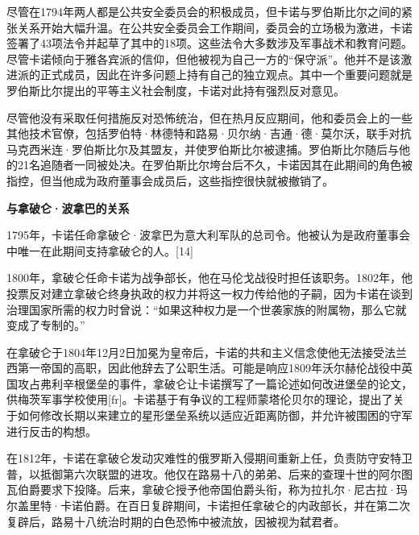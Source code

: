 尽管在1794年两人都是公共安全委员会的积极成员，但卡诺与罗伯斯比尔之间的紧张关系开始大幅升温。在公共安全委员会工作期间，委员会的立场极为激进，卡诺签署了43项法令并起草了其中的18项。这些法令大多数涉及军事战术和教育问题。尽管卡诺倾向于雅各宾派的信仰，但他被视为自己一方的“保守派”。他并不是该激进派的正式成员，因此在许多问题上持有自己的独立观点。其中一个重要问题就是罗伯斯比尔提出的平等主义社会制度，卡诺对此持有强烈反对意见。

尽管他没有采取任何措施反对恐怖统治，但在热月反应期间，他和委员会上的一些其他技术官僚，包括罗伯特·林德特和路易·贝尔纳·吉通·德·莫尔沃，联手对抗马克西米连·罗伯斯比尔及其盟友，并使罗伯斯比尔被逮捕。罗伯斯比尔随后与他的21名追随者一同被处决。在罗伯斯比尔垮台后不久，卡诺因其在此期间的角色被指控，但当他成为政府董事会成员后，这些指控很快就被撤销了。

\textbf{与拿破仑·波拿巴的关系}  

1795年，卡诺任命拿破仑·波拿巴为意大利军队的总司令。他被认为是政府董事会中唯一在此期间支持拿破仑的人。[14]  

1800年，拿破仑任命卡诺为战争部长，他在马伦戈战役时担任该职务。1802年，他投票反对建立拿破仑终身执政的权力并将这一权力传给他的子嗣，因为卡诺在谈到治理国家所需的权力时曾说：“如果这种权力是一个世袭家族的附属物，那么它就变成了专制的。”

在拿破仑于1804年12月2日加冕为皇帝后，卡诺的共和主义信念使他无法接受法兰西第一帝国的高职，因此他辞去了公职生活。可能是响应1809年沃尔赫伦战役中英国攻占弗利辛根堡垒的事件，拿破仑让卡诺撰写了一篇论述如何改进堡垒的论文，供梅茨军事学校使用[fr]。卡诺基于有争议的工程师蒙塔伦贝尔的理论，提出了关于如何修改长期以来建立的星形堡垒系统以适应近距离防御，并允许被围困的守军进行反击的构想。

在1812年，卡诺在拿破仑发动灾难性的俄罗斯入侵期间重新上任，负责防守安特卫普，以抵御第六次联盟的进攻。他仅在路易十八的弟弟、后来的查理十世的阿尔图瓦伯爵要求下投降。后来，拿破仑授予他帝国伯爵头衔，称为拉扎尔·尼古拉·玛尔盖里特·卡诺伯爵。在百日复辟期间，卡诺担任拿破仑的内政部长，并在第二次复辟后，路易十八统治时期的白色恐怖中被流放，因被视为弑君者。